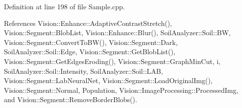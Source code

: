 Definition at line 198 of file Sample.\+cpp.



References Vision\+::\+Enhance\+::\+Adaptive\+Contrast\+Stretch(), Vision\+::\+Segment\+::\+Blob\+List, Vision\+::\+Enhance\+::\+Blur(), Soil\+Analyzer\+::\+Soil\+::\+B\+W, Vision\+::\+Segment\+::\+Convert\+To\+B\+W(), Vision\+::\+Segment\+::\+Dark, Soil\+Analyzer\+::\+Soil\+::\+Edge, Vision\+::\+Segment\+::\+Get\+Blob\+List(), Vision\+::\+Segment\+::\+Get\+Edges\+Eroding(), Vision\+::\+Segment\+::\+Graph\+Min\+Cut, i, Soil\+Analyzer\+::\+Soil\+::\+Intensity, Soil\+Analyzer\+::\+Soil\+::\+L\+A\+B, Vision\+::\+Segment\+::\+Lab\+Neural\+Net, Vision\+::\+Segment\+::\+Load\+Original\+Img(), Vision\+::\+Segment\+::\+Normal, Population, Vision\+::\+Image\+Processing\+::\+Processed\+Img, and Vision\+::\+Segment\+::\+Remove\+Border\+Blobs().


